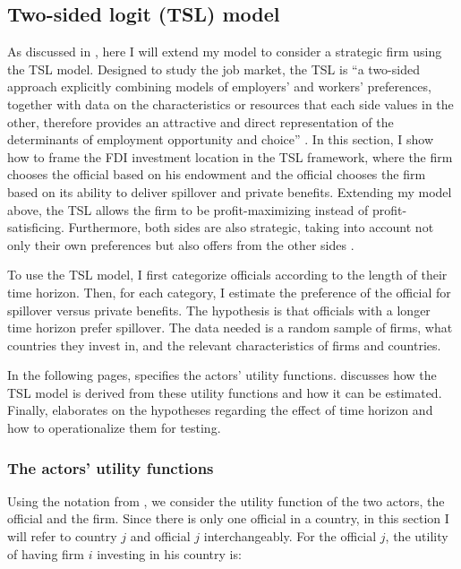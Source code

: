 \subsection{Two-sided logit (TSL) model}

As discussed in , here I will extend my model to consider a strategic firm using the TSL model. Designed to study the job market, the TSL is ``a two-sided approach explicitly combining models of employers' and workers' preferences, together with data on the characteristics or resources that each side values in the other, therefore provides an attractive and direct representation of the determinants of employment opportunity and choice'' \citep[117]{Logan1996}. In this section, I show how to frame the FDI investment location in the TSL framework, where the firm chooses the official based on his endowment and the official chooses the firm based on its ability to deliver spillover and private benefits. Extending my model above, the TSL allows the firm to be profit-maximizing instead of profit-satisficing. Furthermore, both sides are also strategic, taking into account not only their own preferences but also offers from the other sides \citep{Logan1996a}.

To use the TSL model, I first categorize officials according to the length of their time horizon. Then, for each category, I estimate the preference of the official for spillover versus private benefits. The hypothesis is that officials with a longer time horizon prefer spillover. The data needed is a random sample of firms, what countries they invest in, and the relevant characteristics of firms and countries.

In the following pages,  specifies the actors' utility functions.  discusses how the TSL model is derived from these utility functions and how it can be estimated. Finally,  elaborates on the hypotheses regarding the effect of time horizon and how to operationalize them for testing.

\subsubsection{The actors' utility functions}
\label{sec:tsl_actor_utility}


Using the notation from \citet{Logan1998}, we consider the utility function of the two actors, the official and the firm. Since there is only one official in a country, in this section I will refer to country $j$ and official $j$ interchangeably. For the official $j$, the utility of having firm $i$ investing in his country is:

